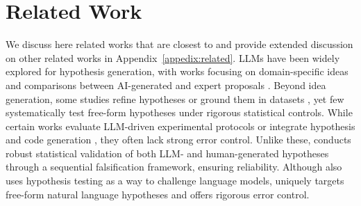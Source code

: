 \section{Related Work}
We discuss here related works that are closest to   \mname and provide extended discussion on other related works in Appendix~\ref{appedix:related}. LLMs have been widely explored for hypothesis generation, with works focusing on domain-specific ideas \citep{wang2024scimonscientificinspirationmachines, baek2024researchagentiterativeresearchidea, yang2024largelanguagemodelsautomated} and comparisons between AI-generated and expert proposals \citep{si2024llmsgeneratenovelresearch}. Beyond idea generation, some studies refine hypotheses \citep{honovich-etal-2023-instruction, wang2024hypothesissearchinductivereasoning} or ground them in datasets \citep{majumder2024discoverybench}, yet few systematically test free-form hypotheses under rigorous statistical controls. While certain works evaluate LLM-driven experimental protocols \citep{tian2024scicoderesearchcodingbenchmark, gu2024bladebenchmarkinglanguagemodel} or integrate hypothesis and code generation \citep{li2024mlrcopilotautonomousmachinelearning, lu2024aiscientistfullyautomated, ifargan2024autonomousllmdrivenresearchdata, majumder2024discoverybench}, they often lack strong error control. Unlike these, \mname conducts robust statistical validation of both LLM- and human-generated hypotheses through a sequential falsification framework, ensuring reliability. Although \citet{li2024critical} also uses hypothesis testing as a way to challenge language models, \mname uniquely targets free-form natural language hypotheses and offers rigorous error control.